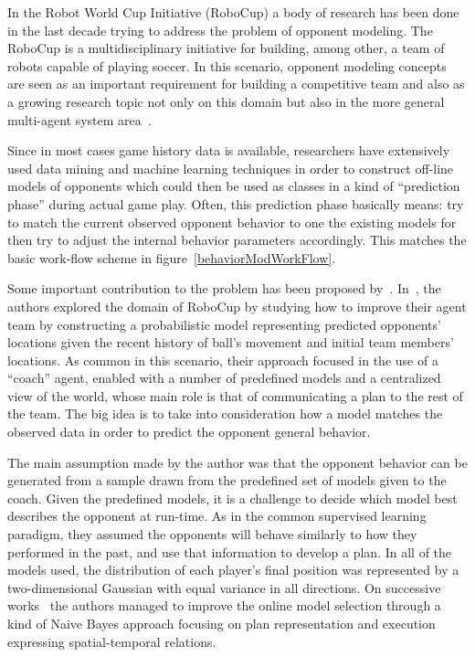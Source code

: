 In the Robot World Cup Initiative (RoboCup) a body of research has been done in the last decade trying to address the problem of opponent modeling. The RoboCup is a multidisciplinary initiative for building, among other, a team of robots capable of playing soccer. In this scenario, opponent modeling concepts are seen as an important requirement for building a competitive team and also as a growing research topic not only on this domain but also in the more general multi-agent system area~\citep{rofer_overview_2012}. 

Since in most cases game history data is available, researchers have extensively used data mining and machine learning techniques in order to construct off-line models of opponents which could then be used as classes in a kind of ``prediction phase'' during actual game play. Often, this prediction phase basically means: try to match the current observed opponent behavior to one the existing models for then try to adjust the internal behavior parameters accordingly. This matches the basic work-flow scheme in figure~\ref{behaviorModWorkFlow}.

Some important contribution to the problem has been proposed by~\citep{fix_behavior_2000,riley_recognizing_2002,riley_coaching_2001,riley_planning_2002}. In~\cite{riley_recognizing_2002}, the authors explored the domain of RoboCup by studying how to improve their agent team by constructing a probabilistic model representing predicted opponents' locations given the recent history of ball's movement and initial team members' locations. As common in this scenario, their approach focused in the use of a ``coach'' agent, enabled with a number of predefined models and a centralized view of the world, whose main role is that of communicating a plan to the rest of the team. The big idea is to take into consideration how a model matches the observed data in order to predict the opponent general behavior. 

The main assumption made by the author was that the opponent behavior can be generated from a sample drawn from the predefined set of models given to the coach. Given the predefined models, it is a challenge to decide which model best describes the opponent at run-time. As in the common supervised learning paradigm, they assumed the opponents will behave similarly to how they performed in the past, and use that information to develop a plan. In all of the models used, the distribution of each player's final position was represented by a two-dimensional Gaussian with equal variance in all directions. On successive works~\citep{riley_coaching_2001,riley_planning_2002} the authors managed to improve the online model selection through a kind of Naive Bayes approach focusing on plan representation and execution expressing spatial-temporal relations. 

